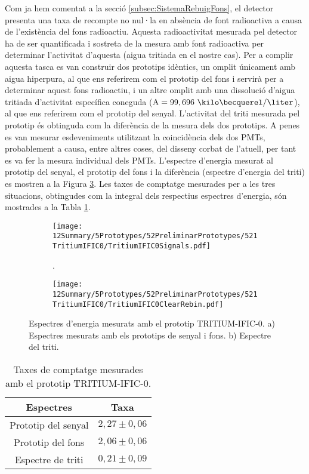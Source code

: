Com ja hem comentat a la secció \ref{subsec:SistemaRebuigFons}, el detector presenta una taxa de recompte no nul·la en absència de font radioactiva a causa de l'existència del fons radioactiu. Aquesta radioactivitat mesurada pel detector ha de ser quantificada i sostreta de la mesura amb font radioactiva per determinar l'activitat d'aquesta (aigua tritiada en el nostre cas). Per a complir aquesta tasca es van construir dos prototips idèntics, un omplit únicament amb aigua hiperpura, al que ens referirem com el prototip del fons i servirà per a determinar aquest fons radioactiu, i un altre omplit amb una dissolució d'aigua tritiada d'activitat específica coneguda ($\text{A}=99,696~\kilo\becquerel/\liter$), al que ens referirem com el prototip del senyal. L'activitat del triti mesurada pel prototip és obtinguda com la diferència de la mesura dels dos prototips. A penes es van mesurar esdeveniments utilitzant la coincidència dels dos PMTs, probablement a causa, entre altres coses, del disseny corbat de l'atuell, per tant es va fer la mesura individual dels PMTs. L'espectre d'energia mesurat al prototip del senyal, el prototip del fons i la diferència (espectre d'energia del triti) es mostren a la Figura \ref{fig:EspectresEnergeticsTritiumIFIC0}. Les taxes de comptatge mesurades per a les tres situacions, obtingudes com la integral dels respectius espectres d'energia, són mostrades a la Tabla \ref{tab:ContesPerSegonTRITIUMIFIC0}. 

\begin{figure}
\centering
    \begin{subfigure}[b]{1\textwidth}
    \centering
    \texttt{[image: 12Summary/5Prototypes/52PreliminarPrototypes/521TritiumIFIC0/TritiumIFIC0Signals.pdf]}  
    \caption{.\label{subfig:EspectreSenyalFonsTritiumIFIC0}}
    \end{subfigure}
    \hfill
    \begin{subfigure}[b]{1\textwidth}
    \centering
    \texttt{[image: 12Summary/5Prototypes/52PreliminarPrototypes/521TritiumIFIC0/TritiumIFIC0ClearRebin.pdf]}  
    \caption{\label{subfig:EspectreTritiTritiumIFIC0}}
    \end{subfigure}
 \caption{Espectres d'energia mesurats amb el prototip TRITIUM-IFIC-0. a) Espectres mesurats amb els prototips de senyal i fons. b) Espectre del triti.}
 \label{fig:EspectresEnergeticsTritiumIFIC0}
\end{figure}

\begin{table}[htbp]
\centering{}%
\begin{tabular}{cc}
\toprule 
Espectres & Taxa \tabularnewline
\midrule
\midrule 
Prototip del senyal & $2,27 \pm 0,06$ \tabularnewline
Prototip del fons & $2,06 \pm 0,06$ \tabularnewline  
Espectre de triti & $0,21 \pm 0,09$ \tabularnewline
\bottomrule
\end{tabular}
\caption{Taxes de comptatge mesurades amb el prototip TRITIUM-IFIC-0.}
\label{tab:ContesPerSegonTRITIUMIFIC0}
\end{table}

